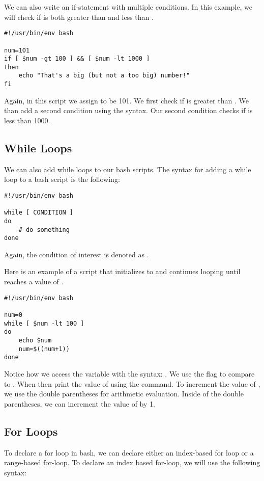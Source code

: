 \documentclass{article}
\begin{document}
We can also write an if-statement with multiple conditions. In this example, we will check if  is both greater than  and less than .
\begin{lstlisting}[style=Python]
#!/usr/bin/env bash

num=101
if [ $num -gt 100 ] && [ $num -lt 1000 ]
then
	echo "That's a big (but not a too big) number!"
fi

\end{lstlisting}

Again, in this script we assign  to be 101. We first check if  is greater than . We than add a second condition using the \inlinecode{\&\&} syntax. Our second condition checks if  is less than 1000. 
\par

\subsection{While Loops}
We can also add while loops to our bash scripts. The syntax for adding a while loop to a bash script is the following: 
\begin{lstlisting}[style=Python]
#!/usr/bin/env bash

while [ CONDITION ]
do
	# do something
done

\end{lstlisting}
Again, the condition of interest is denoted as .
\par 
Here is an example of a script that initializes  to  and continues looping until  reaches a value of . 
\begin{lstlisting}[style=Python]
#!/usr/bin/env bash

num=0
while [ $num -lt 100 ]
do
	echo $num
	num=$((num+1))
done

\end{lstlisting}
Notice how we access the variable  with the \inlinecode{\$} syntax: . We use the  flag to compare  to . When then print the value of  using the  command. To increment the value of , we use the double parentheses  for arithmetic evaluation. Inside of the double parentheses, we can increment the value of  by 1. 

\subsection{For Loops}
To declare a for loop in bash, we can declare either an index-based for loop or a range-based for-loop. To declare an index based for-loop, we will use the following syntax:
\end{document}

